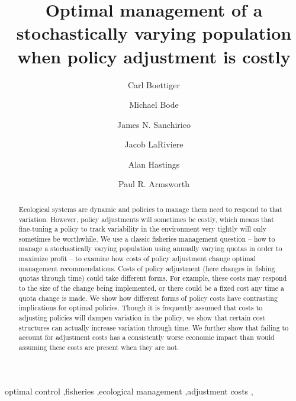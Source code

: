 \documentclass[review,12pt,author-year,titlepage]{components/elsarticle} %
\begin{document}
\begin{frontmatter}

  \title{Optimal management of a stochastically varying population when policy
adjustment is costly}
    \author[cstar]{Carl Boettiger}
    \author[melbourne]{Michael Bode}
  
  
    \author[UCD]{James N. Sanchirico}
  
  
    \author[UTKEcon]{Jacob LaRiviere}
  
  
    \author[UCD]{Alan Hastings}
  
  
    \author[UTKEEB]{Paul R. Armsworth}
  
  
      \address[cstar]{Center for Stock Assessment Research, 110 Shaffer Rd, Santa Cruz, CA
95050, USA}    
    \address[UCD]{Department of Environmental Science and Policy, University of
California, Davis}    
    \address[melbourne]{School of Botany, University of Melbourne, Australia}    
    \address[UTKEEB]{Department of Ecology and Evolutionary Biology, University of Tennessee,
Knoxville}    
    \address[UTKEcon]{Department of Economics, University of Tennessee, Knoxville}    
  
  \begin{abstract}
  Ecological systems are dynamic and policies to manage them need to
  respond to that variation. However, policy adjustments will sometimes be
  costly, which means that fine-tuning a policy to track variability in
  the environment very tightly will only sometimes be worthwhile. We use a
  classic fisheries management question -- how to manage a stochastically
  varying population using annually varying quotas in order to maximize
  profit -- to examine how costs of policy adjustment change optimal
  management recommendations. Costs of policy adjustment (here changes in
  fishing quotas through time) could take different forms. For example,
  these costs may respond to the size of the change being implemented, or
  there could be a fixed cost any time a quota change is made. We show how
  different forms of policy costs have contrasting implications for
  optimal policies. Though it is frequently assumed that costs to
  adjusting policies will dampen variation in the policy, we show that
  certain cost structures can actually increase variation through time. We
  further show that failing to account for adjustment costs has a
  consistently worse economic impact than would assuming these costs are
  present when they are not.
  \end{abstract}
   \begin{keyword} optimal control \sep fisheries \sep ecological management \sep adjustment costs \sep \end{keyword}
 \end{frontmatter}
\end{document}
